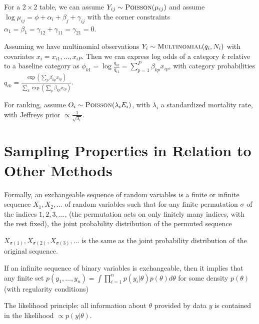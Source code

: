 For a $2 \times 2$ table, we can assume $Y_{ij} \sim
\textsc{Poisson}(\mu_{ij})$ and assume $\log \mu_{ij} = \phi +
\alpha_{i} + \beta_{j} + \gamma_{ij}$ with the corner
constraints$\alpha_{1} = \beta_{1} = \gamma_{12} + \gamma_{11} =
\gamma_{21} = 0$.

Assuming we have multinomial observations $Y_{i} \sim
\textsc{Multinomial}(q_{i}, N_{i})$ with covariates $x_{i} = x_{i1},
\dots, x_{iP}$. Then we can express log odds of a category $k$
relative to a baseline category as $\phi_{k1} = \log
\frac{q_{ik}}{q_{i1}} = \sum_{p=1}^{P} \beta_{kp} x_{ip}$, with
category probabilities $q_{ik} = \frac{\exp(\sum_{p} \beta_{kp}
  x_{ip})}{\sum_{k}^{} \exp(\sum_{p}^{} \beta_{kp} x_{ip})}$.

\begin{defn}
  \label{sec:categ-data-pred-2}
  For ranking, assume $O_{i} \sim \textsc{Poisson}(\lambda_{i}
  E_{i})$, with $\lambda_{i}$ a standardized mortality rate, with
  Jeffreys prior $\propto \frac{1}{\sqrt{\lambda_{i}}}$.
\end{defn}

\section{Sampling Properties in Relation to Other Methods}
\label{sec:sampl-prop-relat}

\begin{defn}
  Formally, an exchangeable sequence of random variables is a finite
  or infinite sequence $X_{1}, X_{2}, \dots$ of random variables such
  that for any finite permutation $\sigma$ of the indices $1, 2, 3,
  \dots$, (the permutation acts on only finitely many indices, with
  the rest fixed), the joint probability distribution of the permuted
  sequence

  $X_{\sigma(1)}, X_{\sigma(2)}, X_{\sigma(3)}, \dots$ is the same as
  the joint probability distribution of the original
  sequence.
\end{defn}

\begin{thm}
  \label{sec:sampl-prop-relat-2}
  If an infinite sequence of binary variables is exchangeable, then it
  implies that any finite set $p(y_{1}, \dots, y_{n}) = \int
  \prod_{i=1}^{n} p(y_{i} | \theta) p(\theta) d \theta$ for some
  density $p(\theta)$ (with regularity conditions)
\end{thm}

\begin{defn}
  \label{sec:sampl-prop-relat-3}
  The likelihood principle: all information about $\theta$ provided by
  data $y$ is contained in the likelihood $\propto p(y | \theta)$.
\end{defn}


